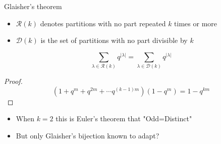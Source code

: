 \documentclass{beamer}
\begin{document}
\begin{frame}{Glaisher's theorem}

\begin{itemize}
    \item $\mathcal{R}(k)$ denotes partitions with no part repeated $k$ times or more
    \item $\mathcal{D}(k)$ is the set of partitions with no part divisible by $k$
\end{itemize}
\begin{theorem}[Glaisher]
$$\sum_{\lambda\in\mathcal{R}(k)}q^{|\lambda|}=\sum_{\lambda\in\mathcal{D}(k)}q^{|\lambda|}$$
\end{theorem}
\begin{proof}$$(1+q^m+q^{2m}+\cdots q^{(k-1)m})(1-q^m)=1-q^{km}$$
\end{proof}
\begin{itemize}
\item When $k=2$ this is Euler's theorem that "Odd=Distinct"
\item But only Glaisher's bijection known to adapt?
\end{itemize}
\end{frame}
\end{document}
